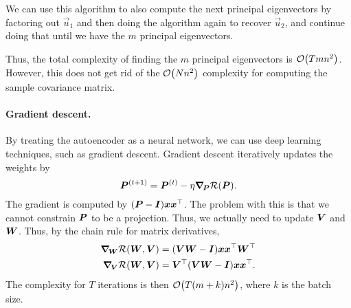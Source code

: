 We can use this algorithm to also compute the next principal eigenvectors by factoring out
$\vec{u}_1$ and then doing the algorithm again to recover $\vec{u}_2$, and continue doing that
until we have the $m$ principal eigenvectors.

Thus, the total complexity of finding the $m$ principal eigenvectors is $\bigo{Tmn^2}$. However,
this does not get rid of the $\bigo{N n^2}$ complexity for computing the sample covariance matrix.

\paragraph{Gradient descent.}

By treating the autoencoder as a neural network, we can use deep learning techniques, such as
gradient descent. Gradient descent iteratively updates the weights by \[
    \mat{P}^{(t+1)} = \mat{P}^{(t)} - \eta \grad{\mathcal{R}(\mat{P})}{\mat{P}}.
\]
The gradient is computed by $(\mat{P} - \mat{I})\vec{x}\transpose{\vec{x}}$. The problem with this
is that we cannot constrain $\mat{P}$ to be a projection. Thus, we actually need to update
$\mat{V}$ and $\mat{W}$. Thus, by the chain rule for matrix derivatives,
\begin{align*}
    \grad{\mathcal{R}(\mat{W}, \mat{V})}{\mat{W}} & = (\mat{V} \mat{W}  - \mat{I}) \vec{x} \transpose{\vec{x}} \transpose{\mat{W}} \\
    \grad{\mathcal{R}(\mat{W}, \mat{V})}{\mat{V}} & = \transpose{\mat{V}} (\mat{V} \mat{W} - \mat{I}) \vec{x} \transpose{\vec{x}}.
\end{align*}
The complexity for $T$ iterations is then $\bigo{T(m+k)n^2}$, where $k$ is the batch size.
